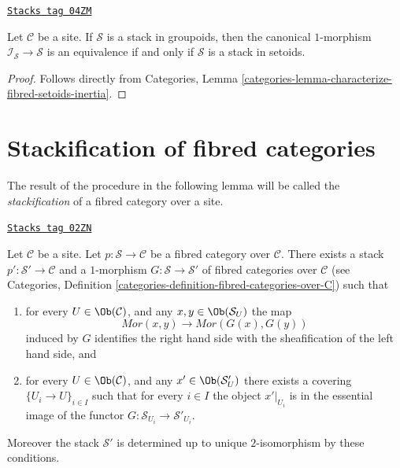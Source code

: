 \begin{lemma}
\label{stacks-lemma-characterize-stack-in-setoids}
\href{https://stacks.math.columbia.edu/tag/04ZM}{\texttt{Stacks tag 04ZM}}

Let $\mathcal{C}$ be a site.
If $\mathcal{S}$ is a stack in groupoids, then the
canonical $1$-morphism $\mathcal{I}_\mathcal{S} \to \mathcal{S}$
is an equivalence if and only if $\mathcal{S}$ is a stack in setoids.
\end{lemma}

\begin{proof}
Follows directly from
Categories, Lemma \ref{categories-lemma-characterize-fibred-setoids-inertia}.
\end{proof}

\section{Stackification of fibred categories}
\label{stacks-section-stackify}
The result of the procedure in the following lemma will be called the
{\it stackification} of a fibred category over a site.

\begin{lemma}[Stackify]
\label{stacks-lemma-stackify}
\href{https://stacks.math.columbia.edu/tag/02ZN}{\texttt{Stacks tag 02ZN}}

Let $\mathcal{C}$ be a site.
Let $p : \mathcal{S} \to \mathcal{C}$ be a fibred category over $\mathcal{C}$.
There exists a stack $p' : \mathcal{S}' \to \mathcal{C}$ and a
$1$-morphism $G : \mathcal{S} \to \mathcal{S}'$
of fibred categories over $\mathcal{C}$ (see
Categories, Definition \ref{categories-definition-fibred-categories-over-C})
such that
\begin{enumerate}
\item for every $U \in \Ob(\mathcal{C})$, and any
$x, y \in \Ob(\mathcal{S}_U)$ the map
$$
\mathit{Mor}(x, y) \longrightarrow \mathit{Mor}(G(x), G(y))
$$
induced by $G$ identifies the right hand side with the sheafification
of the left hand side, and
\item for every $U \in \Ob(\mathcal{C})$, and any
$x' \in \Ob(\mathcal{S}'_U)$ there exists a covering
$\{U_i \to U\}_{i \in I}$ such that for every $i \in I$ the
object $x'|_{U_i}$ is in the essential image of the
functor $G : \mathcal{S}_{U_i} \to \mathcal{S}'_{U_i}$.
\end{enumerate}
Moreover the stack $\mathcal{S}'$ is determined up to unique
$2$-isomorphism by these conditions.
\end{lemma}

